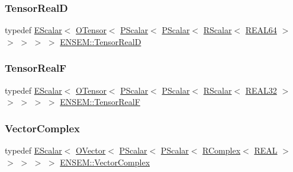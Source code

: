 \mbox{\label{group__defs_gacf3d977d3ad24e35a7d782ef367c6c5c}} 
\subsubsection{\texorpdfstring{TensorRealD}{TensorRealD}}
{\footnotesize\ttfamily typedef \mbox{\hyperlink{classENSEM_1_1EScalar}{E\+Scalar}}$<$ \mbox{\hyperlink{classENSEM_1_1OTensor}{O\+Tensor}}$<$ \mbox{\hyperlink{classENSEM_1_1PScalar}{P\+Scalar}}$<$ \mbox{\hyperlink{classENSEM_1_1PScalar}{P\+Scalar}}$<$ \mbox{\hyperlink{classENSEM_1_1RScalar}{R\+Scalar}}$<$ \mbox{\hyperlink{namespaceENSEM_a85b215b9f1f43715aebee01718e25082}{R\+E\+A\+L64}} $>$ $>$ $>$ $>$ $>$ \mbox{\hyperlink{group__defs_gacf3d977d3ad24e35a7d782ef367c6c5c}{E\+N\+S\+E\+M\+::\+Tensor\+RealD}}}

\mbox{\label{group__defs_ga36a49616408973774f501cbb3964c160}} 
\subsubsection{\texorpdfstring{TensorRealF}{TensorRealF}}
{\footnotesize\ttfamily typedef \mbox{\hyperlink{classENSEM_1_1EScalar}{E\+Scalar}}$<$ \mbox{\hyperlink{classENSEM_1_1OTensor}{O\+Tensor}}$<$ \mbox{\hyperlink{classENSEM_1_1PScalar}{P\+Scalar}}$<$ \mbox{\hyperlink{classENSEM_1_1PScalar}{P\+Scalar}}$<$ \mbox{\hyperlink{classENSEM_1_1RScalar}{R\+Scalar}}$<$ \mbox{\hyperlink{namespaceENSEM_a7540d01191172323e9073283d772576d}{R\+E\+A\+L32}} $>$ $>$ $>$ $>$ $>$ \mbox{\hyperlink{group__defs_ga36a49616408973774f501cbb3964c160}{E\+N\+S\+E\+M\+::\+Tensor\+RealF}}}

\mbox{\label{group__defs_gab151d837d71acacce0e1c38e91e04fa3}} 
\subsubsection{\texorpdfstring{VectorComplex}{VectorComplex}}
{\footnotesize\ttfamily typedef \mbox{\hyperlink{classENSEM_1_1EScalar}{E\+Scalar}}$<$ \mbox{\hyperlink{classENSEM_1_1OVector}{O\+Vector}}$<$ \mbox{\hyperlink{classENSEM_1_1PScalar}{P\+Scalar}}$<$ \mbox{\hyperlink{classENSEM_1_1PScalar}{P\+Scalar}}$<$ \mbox{\hyperlink{classENSEM_1_1RComplex}{R\+Complex}}$<$ \mbox{\hyperlink{namespaceENSEM_a6dd9aa6508168f545c861787e63ddd1e}{R\+E\+AL}} $>$ $>$ $>$ $>$ $>$ \mbox{\hyperlink{group__defs_gab151d837d71acacce0e1c38e91e04fa3}{E\+N\+S\+E\+M\+::\+Vector\+Complex}}}

